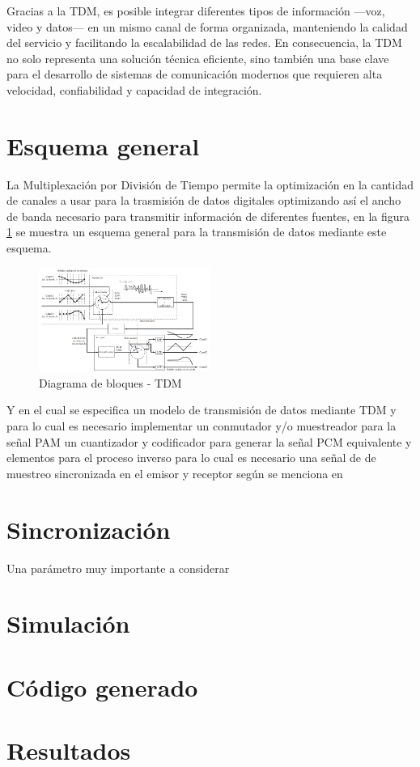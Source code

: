 \documentclass[conference]{IEEEtran}
\begin{document}
	Gracias a la TDM, es posible integrar diferentes tipos de información —voz, video y datos— en un mismo canal de forma organizada, manteniendo la calidad del servicio y facilitando la escalabilidad de las redes. En consecuencia, la TDM no solo representa una solución técnica eficiente, sino también una base clave para el desarrollo de sistemas de comunicación modernos que requieren alta velocidad, confiabilidad y capacidad de integración.
	\section{Esquema general}
	
	La Multiplexación por División de Tiempo permite la optimización en la cantidad de canales a usar para la trasmisión de datos digitales optimizando así el ancho de banda necesario para transmitir información de diferentes fuentes, en la figura \ref{fig:pcm-blocks} se muestra un esquema general para la transmisión de datos mediante este esquema.
	
	\begin{figure}[h]
		\centering
		\includegraphics[width=0.5\textwidth]{media/pcm-blocks}
		\caption{Diagrama de bloques - TDM}
		\label{fig:pcm-blocks}
	\end{figure}
	
	Y en el cual se especifica un modelo de transmisión de datos mediante TDM y para lo cual es necesario implementar un conmutador y/o muestreador para la señal PAM un cuantizador y codificador para generar la señal PCM equivalente y elementos para el proceso inverso para lo cual es necesario una señal de de muestreo sincronizada en el emisor y receptor según se menciona en \cite{couch2012sistemas}
	
	\section{Sincronización}
	
	Una parámetro muy importante a considerar 
	
	\section{Simulación}
	\section{Código generado}
	\section{Resultados}
	
	
	
\end{document}
